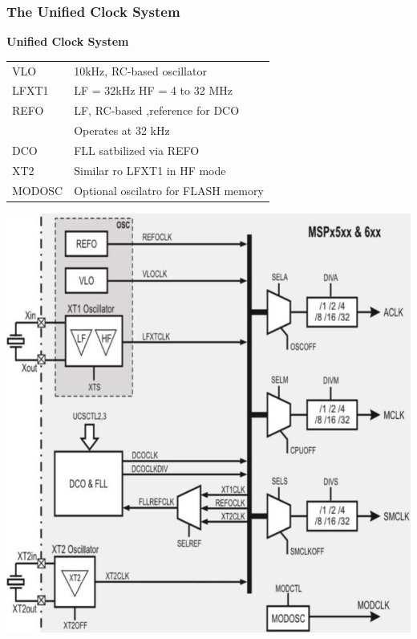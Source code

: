 \subsubsection{The Unified Clock System}
\begin{minipage}{0.585\linewidth}
    \textbf{Unified Clock System}\newline
    \begin{tabular}{ll}
       VLO      & 10kHz, RC-based oscillator    \\
       LFXT1    & LF = 32kHz HF = 4 to 32 MHz   \\
       REFO     & LF, RC-based ,reference for DCO\\
                & Operates at 32 kHz\\
       DCO      & FLL satbilized via REFO \\
       XT2      & Similar ro LFXT1 in HF mode\\
       MODOSC   & Optional oscilatro for FLASH memory\\
    \end{tabular}
\end{minipage}
\begin{minipage}{0.41\linewidth}
    \includegraphics[width=0.85\linewidth]{images/UnifiedClock} 
\end{minipage}

